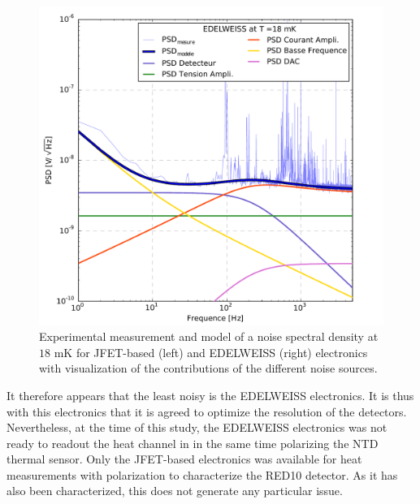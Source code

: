 \begin{figure}
\begin{minipage}{0.49\textwidth}
\includegraphics[width=\textwidth]{Figures/Ethem/edel_18.pdf}
\end{minipage}
\caption{Experimental measurement and model of a noise spectral density at $18$ mK for JFET-based (left) and EDELWEISS (right) electronics with visualization of the contributions of the different noise sources.}
\label{fig:noise-sources}
\end{figure}

It therefore appears that the least noisy is the EDELWEISS electronics. It is thus with this electronics that it is agreed to optimize the resolution of the detectors. Nevertheless, at the time of this study, the EDELWEISS electronics was not ready to readout the heat channel in in the same time polarizing the NTD thermal sensor. Only the JFET-based electronics was available for heat measurements with polarization to characterize the RED10 detector. As it has also been characterized, this does not generate any particular issue.

